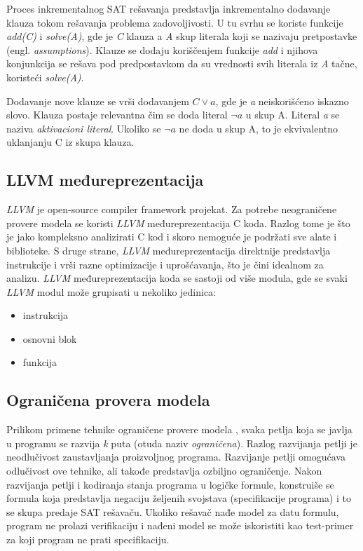 \documentclass[a4paper]{article}
\theoremstyle{plain}
\theoremstyle{definition}
\begin{document}
Proces inkrementalnog SAT rešavanja \cite{iss} predstavlja inkrementalno dodavanje klauza tokom rešavanja problema zadovoljivosti. U tu svrhu se koriste funkcije \emph{add(C)} i \emph{solve(A)}, gde je \emph{C} klauza a \emph{A} skup literala koji se nazivaju pretpostavke (engl. \emph{assumptions}). Klauze se dodaju koriščenjem funkcije \emph{add} i njihova konjunkcija se rešava pod predpostavkom da su vrednosti svih literala iz \emph{A} tačne, koristeći \emph{solve(A)}.

Dodavanje nove klauze se vrši dodavanjem $C\vee{}a$, gde je \emph{a} neiskorišćeno iskazno slovo. Klauza postaje relevantna čim se doda literal $\neg{}a$ u skup A. Literal \emph{a} se naziva \emph{aktivacioni literal}. Ukoliko se $\neg{}a$ ne doda u skup A, to je ekvivalentno uklanjanju C iz skupa klauza.

\subsection{LLVM međureprezentacija}
\label{subsec:LLVM}

\emph{LLVM} \cite{llvm} je open-source compiler framework projekat. Za potrebe neograničene provere modela se koristi \emph{LLVM} međureprezentacija C koda. Razlog tome je što je jako kompleksno analizirati C kod i skoro nemoguće je podržati sve alate i biblioteke. S druge strane, \emph{LLVM} međureprezentacija direktnije predstavlja instrukcije i vrši razne optimizacije i uprošćavanja, što je čini idealnom za analizu. \emph{LLVM} međureprezentacija koda se sastoji od više modula, gde se svaki \emph{LLVM} modul može grupisati u nekoliko jedinica:
\begin{itemize}
    \item instrukcija
    \item osnovni blok
    \item funkcija
\end{itemize}

\subsection{Ograničena provera modela}
\label{subsec:BMC}

Prilikom primene tehnike ograničene provere modela \cite{bsmc}, svaka petlja koja se javlja u programu se razvija \emph{k} puta (otuda naziv \emph{ograničena}). Razlog razvijanja petlji je neodlučivost zaustavljanja proizvoljnog programa. Razvijanje petlji omogućava odlučivost ove tehnike, ali takođe predstavlja ozbiljno ograničenje. Nakon razvijanja petlji i kodiranja stanja programa u logičke formule, konstruiše se formula koja predstavlja negaciju željenih svojstava (specifikacije programa) i to se skupa predaje SAT rešavaču. Ukoliko rešavač nađe model za datu formulu, program ne prolazi verifikaciju i nađeni model se može iskoristiti kao test-primer za koji program ne prati specifikaciju.
\end{document}
